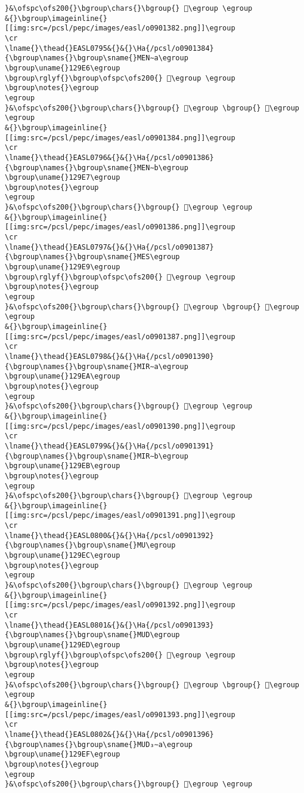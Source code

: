 \begin{verbatim}
}&\ofspc\ofs200{}\bgroup\chars{}\bgroup{} 𒧤\egroup \egroup
&{}\bgroup\imageinline{}[[img:src=/pcsl/pepc/images/easl/o0901382.png]]\egroup
\cr
\lname{}\thead{}EASL0795&{}&{}\Ha{/pcsl/o0901384}{\bgroup\names{}\bgroup\sname{}MEN∼a\egroup
\bgroup\uname{}129E6\egroup
\bgroup\rglyf{}\bgroup\ofspc\ofs200{} 𒧦\egroup \egroup
\bgroup\notes{}\egroup
\egroup
}&\ofspc\ofs200{}\bgroup\chars{}\bgroup{} 𒧥\egroup \bgroup{} 𒧦\egroup \egroup
&{}\bgroup\imageinline{}[[img:src=/pcsl/pepc/images/easl/o0901384.png]]\egroup
\cr
\lname{}\thead{}EASL0796&{}&{}\Ha{/pcsl/o0901386}{\bgroup\names{}\bgroup\sname{}MEN∼b\egroup
\bgroup\uname{}129E7\egroup
\bgroup\notes{}\egroup
\egroup
}&\ofspc\ofs200{}\bgroup\chars{}\bgroup{} 𒧧\egroup \egroup
&{}\bgroup\imageinline{}[[img:src=/pcsl/pepc/images/easl/o0901386.png]]\egroup
\cr
\lname{}\thead{}EASL0797&{}&{}\Ha{/pcsl/o0901387}{\bgroup\names{}\bgroup\sname{}MES\egroup
\bgroup\uname{}129E9\egroup
\bgroup\rglyf{}\bgroup\ofspc\ofs200{} 𒧩\egroup \egroup
\bgroup\notes{}\egroup
\egroup
}&\ofspc\ofs200{}\bgroup\chars{}\bgroup{} 𒧨\egroup \bgroup{} 𒧩\egroup \egroup
&{}\bgroup\imageinline{}[[img:src=/pcsl/pepc/images/easl/o0901387.png]]\egroup
\cr
\lname{}\thead{}EASL0798&{}&{}\Ha{/pcsl/o0901390}{\bgroup\names{}\bgroup\sname{}MIR∼a\egroup
\bgroup\uname{}129EA\egroup
\bgroup\notes{}\egroup
\egroup
}&\ofspc\ofs200{}\bgroup\chars{}\bgroup{} 𒧪\egroup \egroup
&{}\bgroup\imageinline{}[[img:src=/pcsl/pepc/images/easl/o0901390.png]]\egroup
\cr
\lname{}\thead{}EASL0799&{}&{}\Ha{/pcsl/o0901391}{\bgroup\names{}\bgroup\sname{}MIR∼b\egroup
\bgroup\uname{}129EB\egroup
\bgroup\notes{}\egroup
\egroup
}&\ofspc\ofs200{}\bgroup\chars{}\bgroup{} 𒧫\egroup \egroup
&{}\bgroup\imageinline{}[[img:src=/pcsl/pepc/images/easl/o0901391.png]]\egroup
\cr
\lname{}\thead{}EASL0800&{}&{}\Ha{/pcsl/o0901392}{\bgroup\names{}\bgroup\sname{}MU\egroup
\bgroup\uname{}129EC\egroup
\bgroup\notes{}\egroup
\egroup
}&\ofspc\ofs200{}\bgroup\chars{}\bgroup{} 𒧬\egroup \egroup
&{}\bgroup\imageinline{}[[img:src=/pcsl/pepc/images/easl/o0901392.png]]\egroup
\cr
\lname{}\thead{}EASL0801&{}&{}\Ha{/pcsl/o0901393}{\bgroup\names{}\bgroup\sname{}MUD\egroup
\bgroup\uname{}129ED\egroup
\bgroup\rglyf{}\bgroup\ofspc\ofs200{} 𒧭\egroup \egroup
\bgroup\notes{}\egroup
\egroup
}&\ofspc\ofs200{}\bgroup\chars{}\bgroup{} 𒧭\egroup \bgroup{} 𒧮\egroup \egroup
&{}\bgroup\imageinline{}[[img:src=/pcsl/pepc/images/easl/o0901393.png]]\egroup
\cr
\lname{}\thead{}EASL0802&{}&{}\Ha{/pcsl/o0901396}{\bgroup\names{}\bgroup\sname{}MUD₃∼a\egroup
\bgroup\uname{}129EF\egroup
\bgroup\notes{}\egroup
\egroup
}&\ofspc\ofs200{}\bgroup\chars{}\bgroup{} 𒧯\egroup \egroup

\end{verbatim}
